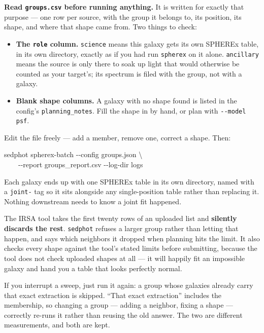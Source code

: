 \documentclass[11pt]{article}
\begin{document}
\textbf{Read \texttt{groups.csv} before running anything.} It is written for
exactly that purpose --- one row per source, with the group it belongs to,
its position, its shape, and where that shape came from. Two things to check:

\begin{itemize}
\item \textbf{The \texttt{role} column.} \texttt{science} means this galaxy
  gets its own SPHEREx table, in its own directory, exactly as if you had
  run \texttt{spherex} on it alone. \texttt{ancillary} means the source is
  only there to soak up light that would otherwise be counted as your
  target's; its spectrum is filed with the group, not with a galaxy.
\item \textbf{Blank shape columns.} A galaxy with no shape found is listed
  in the config's \texttt{planning\_notes}. Fill the shape in by hand, or
  plan with \texttt{-{}-model psf}.
\end{itemize}

Edit the file freely --- add a member, remove one, correct a shape. Then:

\begin{cmd}\ttfamily\frenchspacing
sedphot spherex-batch -{}-config groups.json \textbackslash\\
\mbox{}~~~~-{}-report groups\_report.csv -{}-log-dir logs
\end{cmd}

Each galaxy ends up with one SPHEREx table in its own directory, named with
a \texttt{joint-} tag so it sits alongside any single-position table rather
than replacing it. Nothing downstream needs to know a joint fit happened.

\begin{warnbox}
The IRSA tool takes the first twenty rows of an uploaded list and
\textbf{silently discards the rest}. \texttt{sedphot} refuses a larger group
rather than letting that happen, and says which neighbors it dropped when
planning hits the limit. It also checks every shape against the tool's
stated limits before submitting, because the tool does not check uploaded
shapes at all --- it will happily fit an impossible galaxy and hand you a
table that looks perfectly normal.
\end{warnbox}

If you interrupt a sweep, just run it again: a group whose galaxies already
carry that exact extraction is skipped. \enquote{That exact extraction}
includes the membership, so changing a group --- adding a neighbor, fixing a
shape --- correctly re-runs it rather than reusing the old answer. The two
are different measurements, and both are kept.
\end{document}
